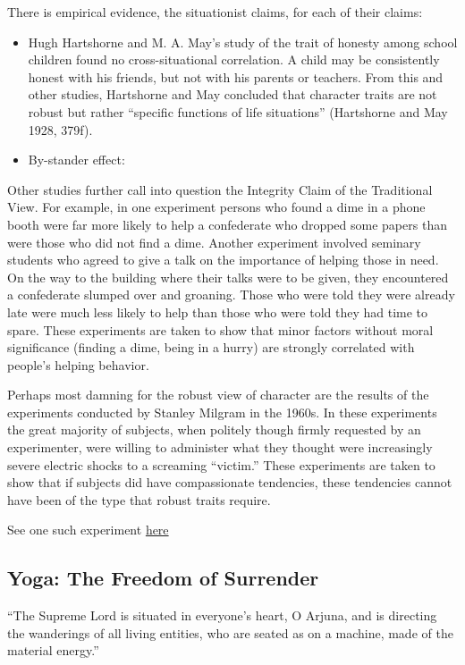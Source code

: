 \documentclass[]{article}
\begin{document}
There is empirical evidence, the situationist claims, for each of their
claims:

\begin{itemize}
\itemsep1pt\parskip0pt
\item
  Hugh Hartshorne and M. A. May's study of the trait of honesty among
  school children found no cross-situational correlation. A child may be
  consistently honest with his friends, but not with his parents or
  teachers. From this and other studies, Hartshorne and May concluded
  that character traits are not robust but rather ``specific functions
  of life situations'' (Hartshorne and May 1928, 379f).
\item
  By-stander effect:
\end{itemize}

Other studies further call into question the Integrity Claim of the
Traditional View. For example, in one experiment persons who found a
dime in a phone booth were far more likely to help a confederate who
dropped some papers than were those who did not find a dime. Another
experiment involved seminary students who agreed to give a talk on the
importance of helping those in need. On the way to the building where
their talks were to be given, they encountered a confederate slumped
over and groaning. Those who were told they were already late were much
less likely to help than those who were told they had time to spare.
These experiments are taken to show that minor factors without moral
significance (finding a dime, being in a hurry) are strongly correlated
with people's helping behavior.

Perhaps most damning for the robust view of character are the results of
the experiments conducted by Stanley Milgram in the 1960s. In these
experiments the great majority of subjects, when politely though firmly
requested by an experimenter, were willing to administer what they
thought were increasingly severe electric shocks to a screaming
``victim.'' These experiments are taken to show that if subjects did
have compassionate tendencies, these tendencies cannot have been of the
type that robust traits require.

See one such experiment
\href{https://www.youtube.com/watch?v=OSsPfbup0ac\&spfreload=1}{here}

\subsection{Yoga: The Freedom of
Surrender}\label{yoga-the-freedom-of-surrender}

``The Supreme Lord is situated in everyone's heart, O Arjuna, and is
directing the wanderings of all living entities, who are seated as on a
machine, made of the material energy.''
\end{document}
